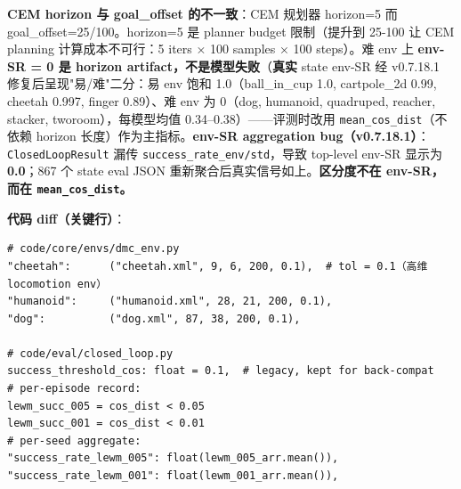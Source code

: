 \documentclass[11pt,a4paper]{article}
\begin{document}
\textbf{CEM horizon 与 goal\_offset 的不一致}：CEM 规划器 horizon=5 而 goal\_offset=25/100。horizon=5 是 planner budget 限制（提升到 25-100 让 CEM planning 计算成本不可行：5 iters × 100 samples × 100 steps）。难 env 上 \textbf{env-SR = 0 是 horizon artifact，不是模型失败}（\textbf{真实} state env-SR 经 v0.7.18.1 修复后呈现"易/难"二分：易 env 饱和 1.0（ball\_in\_cup 1.0, cartpole\_2d 0.99, cheetah 0.997, finger 0.89）、难 env 为 0（dog, humanoid, quadruped, reacher, stacker, tworoom），每模型均值 0.34–0.38）——评测时改用 \texttt{mean\_cos\_dist}（不依赖 horizon 长度）作为主指标。\textbf{env-SR aggregation bug（v0.7.18.1）}：\texttt{ClosedLoopResult} 漏传 \texttt{success\_rate\_env/std}，导致 top-level env-SR 显示为 \textbf{0.0}；867 个 state eval JSON 重新聚合后真实信号如上。\textbf{区分度不在 env-SR，而在 \texttt{mean\_cos\_dist}。}

\textbf{代码 diff（关键行）}：\par\smallskip
\begin{verbatim}
# code/core/envs/dmc_env.py
"cheetah":      ("cheetah.xml", 9, 6, 200, 0.1),  # tol = 0.1（高维 locomotion env）
"humanoid":     ("humanoid.xml", 28, 21, 200, 0.1),
"dog":          ("dog.xml", 87, 38, 200, 0.1),

# code/eval/closed_loop.py
success_threshold_cos: float = 0.1,  # legacy, kept for back-compat
# per-episode record:
lewm_succ_005 = cos_dist < 0.05
lewm_succ_001 = cos_dist < 0.01
# per-seed aggregate:
"success_rate_lewm_005": float(lewm_005_arr.mean()),
"success_rate_lewm_001": float(lewm_001_arr.mean()),
\end{verbatim}
\end{document}
